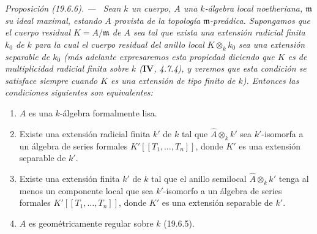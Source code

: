 \documentclass[10pt,oneside]{book}
\makeatletter
\newcommand{\setmanualcurrentlabel}[1]{\def\@currentlabel{#1}}
\newenvironment{proposition}[1][]{%
  \setmanualcurrentlabel{#1}\par\medskip\noindent\itshape Proposición (#1). ---\ }{\par}
\makeatother
\begin{document}
\begin{proposition}[19.6.6]
\label{0.19.6.6-es}
Sean $k$ un cuerpo, $A$ una $k$-álgebra local noetheriana, $\mathfrak m$ su
ideal maximal, estando $A$ provista de la topología $\mathfrak m$-preádica.
Supongamos que el cuerpo residual $K=A/\mathfrak m$ de $A$ sea tal que exista
una extensión radicial finita $k_0$ de $k$ para la cual el cuerpo residual del
anillo local $K\otimes_k k_0$ sea una extensión separable de $k_0$ \textup{(más
adelante expresaremos esta propiedad diciendo que $K$ es de
\emph{multiplicidad radicial finita} sobre $k$ ($\mathbf{IV}$, 4.7.4), y
veremos que esta condición se satisface siempre cuando $K$ es una
\emph{extensión de tipo finito de} $k$)}. Entonces las condiciones siguientes
son equivalentes:
\begin{enumerate}
  \item[\textup{a)}] $A$ es una $k$-álgebra formalmente lisa.
  \item[\textup{b)}] Existe una extensión radicial finita $k'$ de $k$ tal que
  $\widehat A\otimes_k k'$ sea $k'$-isomorfa a un álgebra de series
  formales $K'[[T_1,\ldots,T_n]]$, donde $K'$ es una extensión separable de
  $k'$.
  \item[\textup{b')}] Existe una extensión finita $k'$ de $k$ tal que el anillo
  semilocal $\widehat A\otimes_k k'$ tenga \textup{al menos un} componente local
  que sea $k'$-isomorfo a un álgebra de series formales
  $K'[[T_1,\ldots,T_n]]$, donde $K'$ es una extensión separable de $k'$.
  \item[\textup{c)}] $A$ es geométricamente regular sobre $k$ \textup{(19.6.5)}.
\end{enumerate}
\end{proposition}
\end{document}
